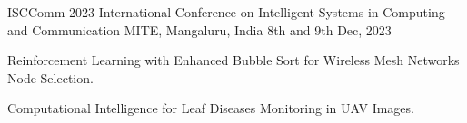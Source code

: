 \begin{cventries}
  \cventry
  {ISCComm-2023}
  {International Conference on Intelligent Systems in Computing and Communication}
  {MITE, Mangaluru, India}
  {8th and 9th Dec, 2023}
  {
    \begin{cvitems}
      \item Reinforcement Learning with Enhanced Bubble Sort for Wireless Mesh Networks Node Selection.
      \item Computational Intelligence for Leaf Diseases Monitoring in UAV Images.
    \end{cvitems}
  }
\end{cventries}